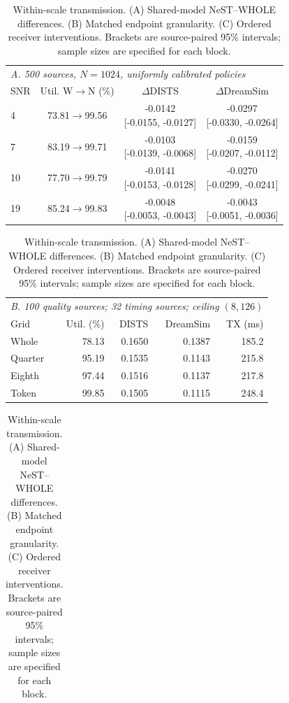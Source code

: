 \begin{table}[t]
\caption{Within-scale transmission. (A) Shared-model NeST--WHOLE differences. (B) Matched endpoint granularity. (C) Ordered receiver interventions. Brackets are source-paired 95\% intervals; sample sizes are specified for each block.}
\label{tab:internal}\centering\footnotesize
\setlength{\tabcolsep}{2.1pt}\renewcommand{\arraystretch}{1.05}
\begin{tabular}{@{}lccc@{}}\toprule
\multicolumn{4}{l}{\textit{A. 500 sources, $N=1024$, uniformly calibrated policies}}\\
SNR & Util. W$\to$N (\%) & $\Delta$DISTS & $\Delta$DreamSim\\
\midrule
4 & 73.81$\to$99.56 & \shortstack{-0.0142\\{}[-0.0155, -0.0127]} & \shortstack{-0.0297\\{}[-0.0330, -0.0264]}\\[2pt]
7 & 83.19$\to$99.71 & \shortstack{-0.0103\\{}[-0.0139, -0.0068]} & \shortstack{-0.0159\\{}[-0.0207, -0.0112]}\\[2pt]
10 & 77.70$\to$99.79 & \shortstack{-0.0141\\{}[-0.0153, -0.0128]} & \shortstack{-0.0270\\{}[-0.0299, -0.0241]}\\[2pt]
19 & 85.24$\to$99.83 & \shortstack{-0.0048\\{}[-0.0053, -0.0043]} & \shortstack{-0.0043\\{}[-0.0051, -0.0036]}\\[2pt]
\bottomrule\end{tabular}
\par\smallskip
\begin{tabular}{@{}lrrrr@{}}\toprule
\multicolumn{5}{l}{\textit{B. 100 quality sources; 32 timing sources; ceiling $(8,126)$}}\\
Grid & Util. (\%) & DISTS & DreamSim & TX (ms)\\\midrule
Whole & 78.13 & 0.1650 & 0.1387 & 185.2\\
Quarter & 95.19 & 0.1535 & 0.1143 & 215.8\\
Eighth & 97.44 & 0.1516 & 0.1137 & 217.8\\
Token & 99.85 & 0.1505 & 0.1115 & 248.4\\
\bottomrule\end{tabular}
\par\smallskip
\begin{tabular}{@{}lccc@{}}\toprule

\end{tabular}
\end{table}
